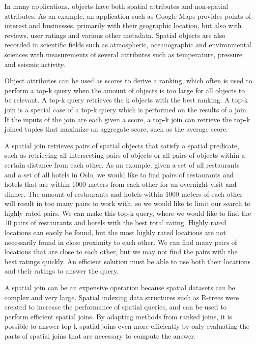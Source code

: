 In many applications, objects have both spatial attributes and non-spatial attributes. As an example, an application such as Google Maps provides points of interest and businesses, primarily with their geographic location, but also with reviews, user ratings and various other metadata. Spatial objects are also recorded in scientific fields such as atmospheric, oceanographic and environmental sciences with measurements of several attributes such as temperature, pressure and seismic activity.

Object attributes can be used as scores to derive a ranking, which often is used to perform a top-k query when the amount of objects is too large for all objects to be relevant. A top-k query retrieves the k objects with the best ranking. A top-k join is a special case of a top-k query which is performed on the results of a join. If the inputs of the join are each given a score, a top-k join can retrieve the top-k joined tuples that maximize an aggregate score, such as the average score.

A spatial join retrieves pairs of spatial objects that satisfy a spatial predicate, such as retrieving all intersecting pairs of objects or all pairs of objects within a certain distance from each other. As an example, given a set of all restaurants and a set of all hotels in Oslo, we would like to find pairs of restaurants and hotels that are within 1000 meters from each other for an overnight visit and dinner. The amount of restaurants and hotels within 1000 meters of each other will result in too many pairs to work with, so we would like to limit our search to highly rated pairs. We can make this top-k query, where we would like to find the 10 pairs of restaurants and hotels with the best total rating. Highly rated locations can easily be found, but the most highly rated locations are not necessarily found in close proximity to each other. We can find many pairs of locations that are close to each other, but we may not find the pairs with the best ratings quickly. An efficient solution must be able to use both their locations and their ratings to answer the query.

A spatial join can be an expensive operation because spatial datasets can be complex and very large. Spatial indexing data structures such as R-trees were created to increase the performance of spatial queries, and can be used to perform efficient spatial joins. By adapting methods from ranked joins, it is possible to answer top-k spatial joins even more efficiently by only evaluating the parts of spatial joins that are necessary to compute the answer. 


